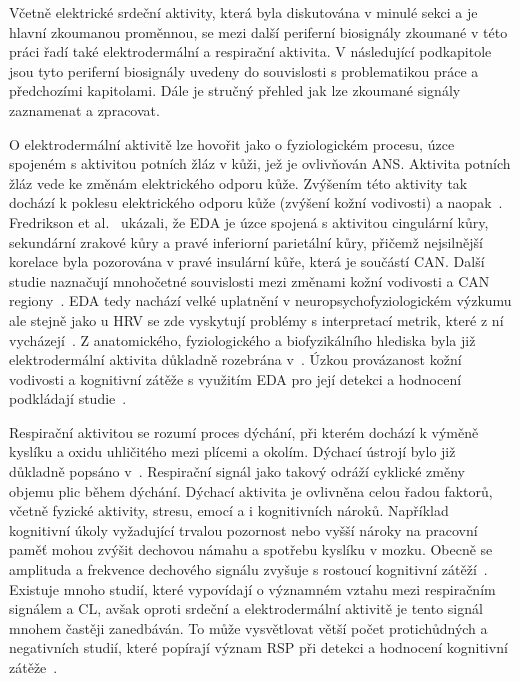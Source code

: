 Včetně elektrické srdeční aktivity, která byla diskutována v minulé sekci a je
hlavní zkoumanou proměnnou, se mezi další periferní biosignály zkoumané v této
práci řadí také elektrodermální a respirační aktivita. V následující podkapitole
jsou tyto periferní biosignály uvedeny do souvislosti s problematikou práce a
předchozími kapitolami. Dále je stručný přehled jak lze zkoumané signály
zaznamenat a zpracovat.

O elektrodermální aktivitě lze hovořit jako o fyziologickém procesu, úzce
spojeném s aktivitou potních žláz v kůži, jež je ovlivňován \gls{ANS}. Aktivita
potních žláz vede ke změnám elektrického odporu kůže. Zvýšením této aktivity tak
dochází k poklesu elektrického odporu kůže (zvýšení kožní vodivosti) a
naopak~\cite{Boucsein2012,Critchley2002,Tronstad2022}. Fredrikson et
al.~\cite{Fredrikson1998} ukázali, že EDA je úzce spojená s aktivitou cingulární
kůry, sekundární zrakové kůry a pravé inferiorní parietální kůry, přičemž
nejsilnější korelace byla pozorována v pravé insulární kůře, která je součástí
\gls{CAN}. Další studie naznačují mnohočetné souvislosti mezi změnami kožní
vodivosti a \gls{CAN} regiony~\cite{Critchley2002,Buchwald2019,Caruelle2019,Sanchez2020}.
EDA tedy nachází velké uplatnění v neuropsychofyziologickém výzkumu ale stejně jako u HRV
se zde vyskytují problémy s interpretací metrik, které z ní
vycházejí~\cite{Blechert2016}. Z anatomického, fyziologického a biofyzikálního
hlediska byla již elektrodermální aktivita důkladně rozebrána v~\cite{Boucsein2012}.
Úzkou provázanost kožní vodivosti a kognitivní zátěže s využitím EDA pro její detekci
a hodnocení podkládají studie~\cite{Bahauddin2021,Ghaderyan2018,Hossain2019,
    Nourbakhsh2012,Paas2003,Posada2018,Shi2007,Shimomura2008}.

Respirační aktivitou se rozumí proces dýchání, při kterém dochází k výměně
kyslíku a oxidu uhličitého mezi plícemi a okolím. Dýchací ústrojí bylo již
důkladně popsáno v~\cite{Kara2010}. Respirační signál jako takový odráží
cyklické změny objemu plic během dýchání. Dýchací aktivita je ovlivněna celou
řadou faktorů, včetně fyzické aktivity, stresu, emocí a i kognitivních nároků.
Například kognitivní úkoly vyžadující trvalou pozornost nebo vyšší nároky na
pracovní paměť mohou zvýšit dechovou námahu a spotřebu kyslíku v mozku. Obecně
se amplituda a frekvence dechového signálu zvyšuje s rostoucí kognitivní
zátěží~\cite{Ayres2021}. Existuje mnoho studií, které vypovídají o významném
vztahu mezi respiračním signálem a \gls{CL}, avšak oproti srdeční a
elektrodermální aktivitě je tento signál mnohem častěji zanedbáván. To může
vysvětlovat větší počet protichůdných a negativních studií, které popírají
význam RSP při detekci a hodnocení kognitivní
zátěže~\cite{Ayres2021,Grassmann2016}.


